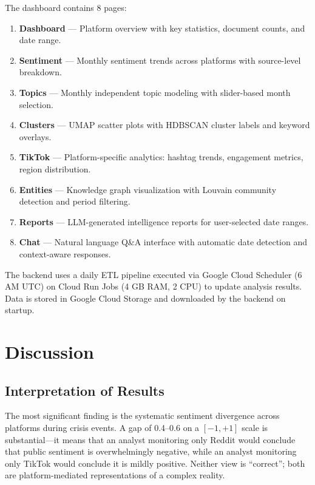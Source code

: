 \documentclass[12pt, letterpaper]{article}
\begin{document}
The dashboard contains 8 pages:
\begin{enumerate}
  \item \textbf{Dashboard} --- Platform overview with key statistics, document counts, and date range.
  \item \textbf{Sentiment} --- Monthly sentiment trends across platforms with source-level breakdown.
  \item \textbf{Topics} --- Monthly independent topic modeling with slider-based month selection.
  \item \textbf{Clusters} --- UMAP scatter plots with HDBSCAN cluster labels and keyword overlays.
  \item \textbf{TikTok} --- Platform-specific analytics: hashtag trends, engagement metrics, region distribution.
  \item \textbf{Entities} --- Knowledge graph visualization with Louvain community detection and period filtering.
  \item \textbf{Reports} --- LLM-generated intelligence reports for user-selected date ranges.
  \item \textbf{Chat} --- Natural language Q\&A interface with automatic date detection and context-aware responses.
\end{enumerate}

The backend uses a daily ETL pipeline executed via Google Cloud Scheduler (6 AM UTC) on Cloud Run Jobs (4 GB RAM, 2 CPU) to update analysis results. Data is stored in Google Cloud Storage and downloaded by the backend on startup.

\section{Discussion}
\label{sec:discussion}

\subsection{Interpretation of Results}

The most significant finding is the systematic sentiment divergence across platforms during crisis events. A gap of 0.4--0.6 on a $[-1, +1]$ scale is substantial---it means that an analyst monitoring only Reddit would conclude that public sentiment is overwhelmingly negative, while an analyst monitoring only TikTok would conclude it is mildly positive. Neither view is ``correct''; both are platform-mediated representations of a complex reality.
\end{document}
